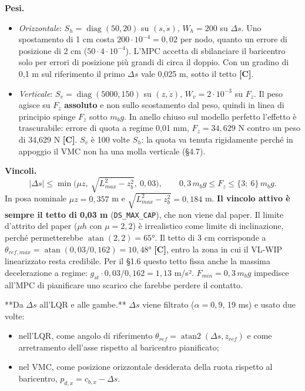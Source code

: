\documentclass[
]{article}
\providecommand{\tightlist}{%
  \setlength{\itemsep}{0pt}\setlength{\parskip}{0pt}}
\begin{document}
\textbf{Pesi.}

\begin{itemize}
\tightlist
\item \emph{Orizzontale}: \(S_h = \operatorname{diag}(50, 20)\) su \((s, \dot s)\), \(W_h = 200\) su \(\Delta s\). Uno spostamento di 1 cm costa \(200\cdot10^{-4} = 0{,}02\) per nodo, quanto un errore di posizione di 2 cm (\(50\cdot 4\cdot10^{-4}\)). L'MPC accetta di sbilanciare il baricentro solo per errori di posizione più grandi di circa il doppio. Con un gradino di 0,1 m sul riferimento il primo \(\Delta s\) vale 0,025 m, sotto il tetto \textbf{[C]}.
\item \emph{Verticale}: \(S_v = \operatorname{diag}(5000, 150)\) su \((z, \dot z)\), \(W_v = 2\cdot10^{-3}\) su \(F_z\). Il peso agisce su \(F_z\) \textbf{assoluto} e non sullo scostamento dal peso, quindi in linea di principio spinge \(F_z\) sotto \(m_bg\). In anello chiuso sul modello perfetto l'effetto è trascurabile: errore di quota a regime 0,01 mm, \(F_z = 34{,}629\) N contro un peso di 34,629 N \textbf{[C]}. \(S_v\) è 100 volte \(S_h\): la quota va tenuta rigidamente perché in appoggio il VMC non ha una molla verticale (§4.7).
\end{itemize}

\textbf{Vincoli.} \[|\Delta s| \le \min\big(\mu z,\ \sqrt{L_{max}^2-z_b^2},\ 0{,}03\big),\qquad 0{,}3\,m_bg\le F_z\le \{3;\ 6\}\,m_bg .\] In posa nominale \(\mu z = 0{,}357\) m e \(\sqrt{L_{max}^2 - z_b^2} = 0{,}184\) m. \textbf{Il vincolo attivo è sempre il tetto di 0,03 m} (\texttt{DS\_MAX\_CAP}), che non viene dal paper. Il limite d'attrito del paper (\(\mu h\) con \(\mu = 2{,}2\)) è irrealistico come limite di inclinazione, perché permetterebbe \(\operatorname{atan}(2{,}2) = 65°\). Il tetto di 3 cm corrisponde a \(\theta_{ref,max} = \operatorname{atan}(0{,}03/0{,}162) = 10{,}48°\) \textbf{[C]}, entro la zona in cui il VL-WIP linearizzato resta credibile. Per il §1.6 questo tetto fissa anche la massima decelerazione a regime: \(g_{st}\cdot0{,}03/0{,}162 = 1{,}13\) m/s². \(F_{min} = 0{,}3\,m_bg\) impedisce all'MPC di pianificare uno scarico che farebbe perdere il contatto.

**Da \(\Delta s\) all'LQR e alle gambe.** \(\Delta s\) viene filtrato (\(\alpha = 0{,}9\), 19 ms) e usato due volte:

\begin{itemize}
\tightlist
\item nell'LQR, come angolo di riferimento \(\theta_{ref} = \operatorname{atan2}(\Delta s, z_{ref})\) e come arretramento dell'asse rispetto al baricentro pianificato;
\item nel VMC, come posizione orizzontale desiderata della ruota rispetto al baricentro, \(p_{d,x} = c_{b,x} - \Delta s\).
\end{itemize}
\end{document}
